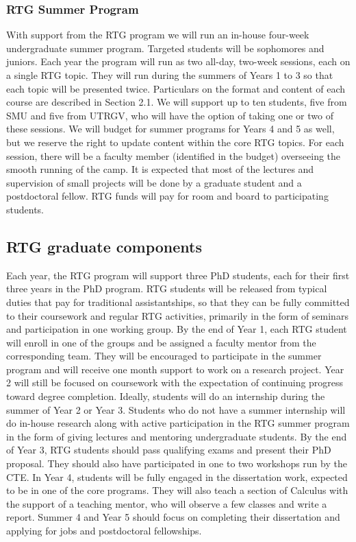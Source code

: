 \documentclass[11pt]{article}
\begin{document}
\subsubsection{RTG Summer Program}
With support from the RTG program we will run an in-house four-week undergraduate summer program.
Targeted students will be sophomores and juniors. Each year the program will run as two all-day, two-week
sessions, each on a single RTG topic. They will run during the summers of Years 1 to 3 so that each topic
will be presented twice. Particulars on the format and content of each course are described in Section 2.1.
We will support up to ten students, five from SMU and five from UTRGV, who will have the option of taking
one or two of these sessions. We will budget for summer programs for Years 4 and 5 as well, but we reserve
the right to update content within the core RTG topics. For each session, there will be a faculty member
(identified in the budget) overseeing the smooth running of the camp. It is expected that most of the lectures
and supervision of small projects will be done by a graduate student and a postdoctoral fellow. RTG funds
will pay for room and board to participating students.

\subsection{RTG graduate components}

Each year, the RTG program will support three PhD students, each for their first three years in the
PhD program. RTG students will be released from typical duties that pay for traditional assistantships, so
that they can be fully committed to their coursework and regular RTG activities, primarily in the form of
seminars and participation in one working group. By the end of Year 1, each RTG student will enroll in one
of the groups and be assigned a faculty mentor from the corresponding team. They will be encouraged to
participate in the summer program and will receive one month support to work on a research project. Year 2
will still be focused on coursework with the expectation of continuing progress toward degree completion.
Ideally, students will do an internship during the summer of Year 2 or Year 3. Students who do not have
a summer internship will do in-house research along with active participation in the RTG summer program
in the form of giving lectures and mentoring undergraduate students. By the end of Year 3, RTG students
should pass qualifying exams and present their PhD proposal. They should also have participated in one to
two workshops run by the CTE. In Year 4, students will be fully engaged in the dissertation work, expected
to be in one of the core programs. They will also teach a section of Calculus with the support of a teaching
mentor, who will observe a few classes and write a report. Summer 4 and Year 5 should focus on completing
their dissertation and applying for jobs and postdoctoral fellowships.
\end{document}
